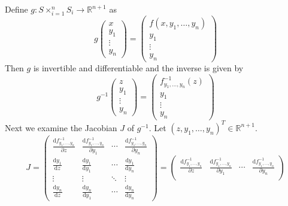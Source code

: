 \documentclass[11pt,a4paper]{book}
\begin{document}
\begin{proof2}
  Define $g : S \times_{i = 1}^{n} S_{i} \rightarrow \mathbb{R}^{n + 1}$ as
  \begin{equation*}
    g \begin{pmatrix}
      x\\y_{1}\\\vdots\\y_{n}
    \end{pmatrix} = \begin{pmatrix}
      f(x, y_{1}, \dots, y_{n})\\
      y_{1}\\\vdots\\y_{n}
    \end{pmatrix}
  \end{equation*}
  Then $g$ is invertible and differentiable and the inverse is given by
  \begin{equation*}
    g^{-1}\begin{pmatrix}
      z\\y_{1}\\\vdots\\y_{n}
    \end{pmatrix} = \begin{pmatrix}
      f_{y_{1}, \dots, y_{n}}^{-1}(z)\\
      y_{1}\\\vdots\\y_{n}
    \end{pmatrix}
  \end{equation*}
  Next we examine the Jacobian $J$ of $g^{-1}$. Let
  $(z, y_{1}, \dots, y_{n})^{T} \in \mathbb{R}^{n + 1}$.
  \begin{equation*}
    J =
    \begin{pmatrix}
      \frac{\mathrm{d}f_{y_{1}, \dots, y_{n}}^{-1}}{\partial z} & \frac{\mathrm{d}f_{y_{1}, \dots, y_{n}}^{-1}}{\partial y_{1}} & \cdots & \frac{\mathrm{d}f_{y_{1}, \dots, y_{n}}^{-1}}{\partial y_{n}}\\
      \frac{\mathrm{d} y_{1}}{\mathrm{d} z} & \frac{\mathrm{d} y_{1}}{\mathrm{d} y_{1}} & \cdots & \frac{\mathrm{d} y_{1}}{\mathrm{d} y_{n}}\\
      \vdots & \vdots & \ddots & \vdots\\
      \frac{\mathrm{d} y_{n}}{\mathrm{d} z} & \frac{\mathrm{d} y_{n}}{\mathrm{d} y_{1}} & \cdots & \frac{\mathrm{d} y_{n}}{\mathrm{d} y_{n}}
    \end{pmatrix}
    =
    \begin{pmatrix}
      \frac{\mathrm{d}f_{y_{1}, \dots, y_{n}}^{-1}}{\partial z} & \frac{\mathrm{d}f_{y_{1}, \dots, y_{n}}^{-1}}{\partial y_{1}} & \cdots & \frac{\mathrm{d}f_{y_{1}, \dots, y_{n}}^{-1}}{\partial y_{n}}\\

\end{pmatrix}
\end{equation*}
\end{proof2}
\end{document}
